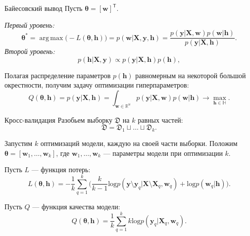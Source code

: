 \documentclass[10pt,pdf,utf8,russian,aspectratio=169]{beamer}
\DeclareMathOperator*{\argmax}{arg\,max}
\begin{document}
\begin{frame}{Байесовский вывод}
Пусть $\boldsymbol{\theta} = [\mathbf{w}]^\mathsf{T}.$

\textit{Первый уровень:}
\[
{\boldsymbol{\theta}}^{*} = \argmax \bigl(-L(\boldsymbol{\theta}, \mathbf{h})\bigr) = p(\mathbf{w}|\mathbf{X}, \mathbf{y}, \mathbf{h}) = \frac{p(\mathbf{y}|\mathbf{X},\mathbf{w})p(\mathbf{w}|\mathbf{h})}{p(\mathbf{y}|\mathbf{X},\mathbf{h})}.
\]
\textit{Второй уровень:}
\[
p(\mathbf{h}|\mathbf{X}, \mathbf{y}) \propto p(\mathbf{y}|\mathbf{X},\mathbf{h})p(\mathbf{h}),
\]

Полагая распределение параметров $p(\mathbf{h})$ равномерным на некоторой большой окрестности, получим задачу оптимизации гиперпараметров:
\[
	Q(\boldsymbol{\theta}, \mathbf{h}) = p(\mathbf{y}|\mathbf{X},\mathbf{h}) = \int_{\mathbf{w} \in \mathbb{R}^u} p(\mathbf{y}|\mathbf{X}, \mathbf{w}) p(\mathbf{w}|\mathbf{h}) \to \max_{\mathbf{h} \in \mathbb{H}}.
\]
\end{frame}

\begin{frame}{Кросс-валидация}
Разобьем выборку $\mathfrak{D}$ на $k$ равных частей:
\[
\mathfrak{D} = \mathfrak{D}_1 \sqcup \dots \sqcup \mathfrak{D}_k.
\]


Запустим $k$ оптимизаций модели, каждую на своей части выборки. Положим $\boldsymbol{\theta} = [\mathbf{w}_1, \dots, \mathbf{w}_k]$, где $\mathbf{w}_1, \dots, \mathbf{w}_k$ --- параметры модели при оптимизации $k$.
 
Пусть $L$ --- функция потерь:
\begin{equation}
\label{eq:cv}
L(\boldsymbol{\theta}, \mathbf{h}) = -\frac{1}{k}\sum_{q=1}^k \bigl(\frac{k}{k-1}\text{log}p(\mathbf{y} \setminus \mathbf{y}_q|\mathbf{X}\setminus \mathbf{X}_q, \mathbf{w}_q) + \text{log}p(\mathbf{w}_q|\mathbf{h})\bigr).
\end{equation}

Пусть $Q$ --- функция качества модели:
\[
Q(\boldsymbol{\theta}, \mathbf{h}) = \frac{1}{k}\sum_{q=1}^k k\text{log}p(\mathbf{y}_q|\mathbf{X}_q, \mathbf{w}_q).
\]

\end{frame}
\end{document}

